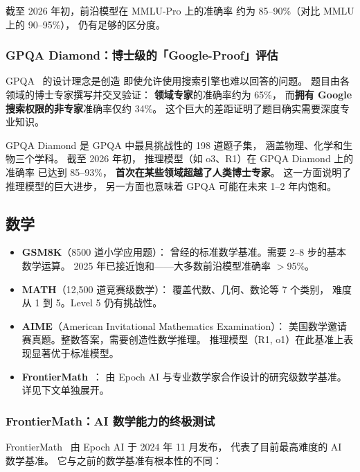 截至 2026 年初，前沿模型在 MMLU-Pro 上的准确率
约为 85--90\%（对比 MMLU 上的 90--95\%），
仍有足够的区分度。

\subsubsection{GPQA Diamond：博士级的「Google-Proof」评估}

GPQA~\cite{rein2024gpqa} 的设计理念是创造
即使允许使用搜索引擎也难以回答的问题。
题目由各领域的博士专家撰写并交叉验证：
\textbf{领域专家}的准确率约为 65\%，
而\textbf{拥有 Google 搜索权限的非专家}准确率仅约 34\%。
这个巨大的差距证明了题目确实需要深度专业知识。

GPQA Diamond 是 GPQA 中最具挑战性的 198 道题子集，
涵盖物理、化学和生物三个学科。
截至 2026 年初，
推理模型（如 o3、R1）在 GPQA Diamond 上的准确率
已达到 85--93\%，
\textbf{首次在某些领域超越了人类博士专家}。
这一方面说明了推理模型的巨大进步，
另一方面也意味着 GPQA 可能在未来 1--2 年内饱和。

\subsection{数学}
\begin{itemize}[noitemsep]
  \item \textbf{GSM8K}（8500 道小学应用题）：
        曾经的标准数学基准。需要 2--8 步的基本数学运算。
        2025 年已接近饱和——大多数前沿模型准确率 $>$95\%。
  \item \textbf{MATH}（12,500 道竞赛级数学）：
        覆盖代数、几何、数论等 7 个类别，
        难度从 1 到 5。Level 5 仍有挑战性。
  \item \textbf{AIME}（American Invitational Mathematics Examination）：
        美国数学邀请赛真题。整数答案，需要创造性数学推理。
        推理模型（R1, o1）在此基准上表现显著优于标准模型。
  \item \textbf{FrontierMath}~\cite{glazer2024frontiermath}：
        由 Epoch AI 与专业数学家合作设计的研究级数学基准。
        详见下文单独展开。
\end{itemize}

\subsubsection{FrontierMath：AI 数学能力的终极测试}

FrontierMath~\cite{glazer2024frontiermath}
由 Epoch AI 于 2024 年 11 月发布，
代表了目前最高难度的 AI 数学基准。
它与之前的数学基准有根本性的不同：

